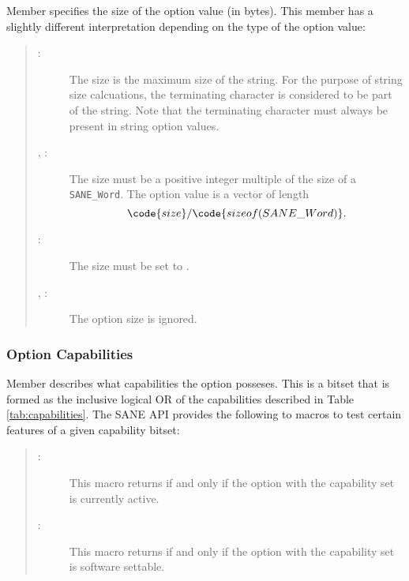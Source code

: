 \documentclass[11pt,DVIps]{report}
\begin{document}
Member  specifies the size of the option value (in bytes).
This member has a slightly different interpretation depending on the
type of the option value:
\begin{quote}
  \begin{description}
  \item[:] The size is the maximum size of
    the string.  For the purpose of string size calcuations, the
    terminating  character is considered to be part of the
    string.  Note that the terminating  character must
    always be present in string option values.
  \item[, :] The size
    must be a positive integer multiple of the size of a
    \verb|SANE_Word|.  The option value is a vector of length
    \[ \code{size}/\code{sizeof(SANE\_Word)}. \]
  \item[:] The size must be set to
    .
  \item[, :] The
    option size is ignored.
  \end{description}
\end{quote}

\subsubsection{Option Capabilities}

Member  describes what capabilities the option posseses.
This is a bitset that is formed as the inclusive logical OR of the
capabilities described in Table \ref{tab:capabilities}.  The SANE API
provides the following to macros to test certain features of a given
capability bitset:
\begin{quote}
  \begin{description}

  \item[:] This macro
    returns  if and only if the option with the
    capability set  is currently active.

  \item[:] This
    macro returns  if and only if the option with the
    capability set  is software settable.
  \end{description}
\end{quote}
\end{document}
